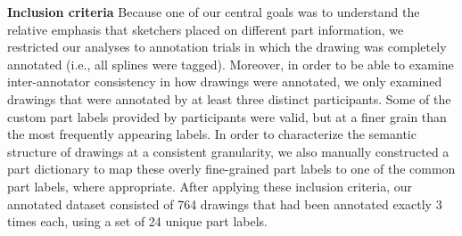 \documentclass[10pt,letterpaper]{article}
\newcommand{\jefan}[1]{{\color{blue}{[jefan: #1]}}}
\begin{document}

\noindent \textbf{Inclusion criteria} \hspace{3mm} Because one of our central goals was to understand the relative emphasis that sketchers placed on different part information, we restricted our analyses to annotation trials in which the drawing was completely annotated (i.e., all splines were tagged). 
Moreover, in order to be able to examine inter-annotator consistency in how drawings were annotated, we only examined drawings that were annotated by at least three distinct participants. 
\jefan{By the way, are we including drawings that were annotated more than three times? We could, of course, and just ignore the 4th and onward... Also, have we ever checked whether the annotations were coming from distinct participants? Not sure, this requires comparing workerId, which we do not save to the group dataframe.}
Some of the custom part labels provided by participants were valid, but at a finer grain than the most frequently appearing labels. \jefan{Perhaps include an example of one of these.} 
In order to characterize the semantic structure of drawings at a consistent granularity, we also manually constructed a part dictionary to map these overly fine-grained part labels to one of the common part labels, where appropriate. 
After applying these inclusion criteria, our annotated dataset consisted of 764 drawings that had been annotated exactly 3 times each, using a set of 24 unique part labels. 
\end{document}
